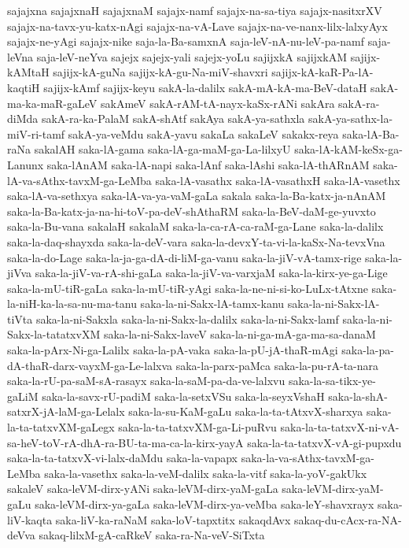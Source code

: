 {sajajxna
sajajxnaH
sajajxnaM
sajajx-namf
sajajx-na-sa-tiya
sajajx-nasitxrXV
sajajx-na-tavx-yu-katx-nAgi
sajajx-na-vA-Lave
sajajx-na-ve-nanx-lilx-lalxyAyx
sajajx-ne-yAgi
sajajx-nike
saja-la-Ba-samxnA
saja-leV-nA-nu-leV-pa-namf
saja-leVna
saja-leV-neYva
sajejx
sajejx-yali
sajejx-yoLu
sajijxkA
sajijxkAM
sajijx-kAMtaH
sajijx-kA-guNa
sajijx-kA-gu-Na-miV-shavxri
sajijx-kA-kaR-Pa-lA-kaqtiH
sajijx-kAmf
sajijx-keyu
sakA-la-dalilx
sakA-mA-kA-ma-BeV-dataH
sakA-ma-ka-maR-gaLeV
sakAmeV
sakA-rAM-tA-nayx-kaSx-rANi
sakAra
sakA-ra-diMda
sakA-ra-ka-PalaM
sakA-shAtf
sakAya
sakA-ya-sathxla
sakA-ya-sathx-la-miV-ri-tamf
sakA-ya-veMdu
sakA-yavu
sakaLa
sakaLeV
sakakx-reya
saka-lA-Ba-raNa
sakalAH
saka-lA-gama
saka-lA-ga-maM-ga-La-lilxyU
saka-lA-kAM-keSx-ga-Lanunx
saka-lAnAM
saka-lA-napi
saka-lAnf
saka-lAshi
saka-lA-thARnAM
saka-lA-va-sAthx-tavxM-ga-LeMba
saka-lA-vasathx
saka-lA-vasathxH
saka-lA-vasethx
saka-lA-va-sethxya
saka-lA-va-ya-vaM-gaLa
sakala
saka-la-Ba-katx-ja-nAnAM
saka-la-Ba-katx-ja-na-hi-toV-pa-deV-shAthaRM
saka-la-BeV-daM-ge-yuvxto
saka-la-Bu-vana
sakalaH
sakalaM
saka-la-ca-rA-ca-raM-ga-Lane
saka-la-dalilx
saka-la-daq-shayxda
saka-la-deV-vara
saka-la-devxY-ta-vi-la-kaSx-Na-tevxVna
saka-la-do-Lage
saka-la-ja-ga-dA-di-liM-ga-vanu
saka-la-jiV-vA-tamx-rige
saka-la-jiVva
saka-la-jiV-va-rA-shi-gaLa
saka-la-jiV-va-varxjaM
saka-la-kirx-ye-ga-Lige
saka-la-mU-tiR-gaLa
saka-la-mU-tiR-yAgi
saka-la-ne-ni-si-ko-LuLx-tAtxne
saka-la-niH-ka-la-sa-nu-ma-tanu
saka-la-ni-Sakx-lA-tamx-kanu
saka-la-ni-Sakx-lA-tiVta
saka-la-ni-Sakxla
saka-la-ni-Sakx-la-dalilx
saka-la-ni-Sakx-lamf
saka-la-ni-Sakx-la-tatatxvXM
saka-la-ni-Sakx-laveV
saka-la-ni-ga-mA-ga-ma-sa-danaM
saka-la-pArx-Ni-ga-Lalilx
saka-la-pA-vaka
saka-la-pU-jA-thaR-mAgi
saka-la-pa-dA-thaR-darx-vayxM-ga-Le-lalxva
saka-la-parx-paMca
saka-la-pu-rA-ta-nara
saka-la-rU-pa-saM-sA-rasayx
saka-la-saM-pa-da-ve-lalxvu
saka-la-sa-tikx-ye-gaLiM
saka-la-savx-rU-padiM
saka-la-setxVSu
saka-la-seyxVshaH
saka-la-shA-satxrX-jA-laM-ga-Lelalx
saka-la-su-KaM-gaLu
saka-la-ta-tAtxvX-sharxya
saka-la-ta-tatxvXM-gaLegx
saka-la-ta-tatxvXM-ga-Li-puRvu
saka-la-ta-tatxvX-ni-vA-sa-heV-toV-rA-dhA-ra-BU-ta-ma-ca-la-kirx-yayA
saka-la-ta-tatxvX-vA-gi-pupxdu
saka-la-ta-tatxvX-vi-lalx-daMdu
saka-la-vapapx
saka-la-va-sAthx-tavxM-ga-LeMba
saka-la-vasethx
saka-la-veM-dalilx
saka-la-vitf
saka-la-yoV-gakUkx
sakaleV
saka-leVM-dirx-yANi
saka-leVM-dirx-yaM-gaLa
saka-leVM-dirx-yaM-gaLu
saka-leVM-dirx-ya-gaLa
saka-leVM-dirx-ya-veMba
saka-leY-shavxrayx
saka-liV-kaqta
saka-liV-ka-raNaM
saka-loV-tapxtitx
sakaqdAvx
sakaq-du-cAcx-ra-NA-deVva
sakaq-lilxM-gA-caRkeV
saka-ra-Na-veV-SiTxta
}
